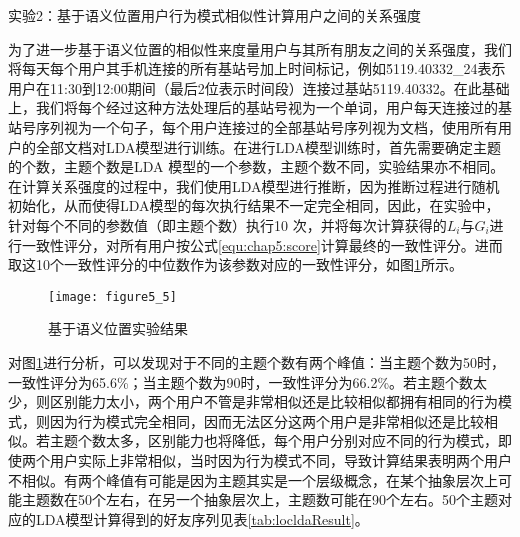 \par 实验2：基于语义位置用户行为模式相似性计算用户之间的关系强度
\par 为了进一步基于语义位置的相似性来度量用户与其所有朋友之间的关系强度，我们将每天每个用户其手机连接的所有基站号加上时间标记，例如\'5119.40332\_24\'表示用户在11:30到12:00期间（最后2位表示时间段）连接过基站5119.40332。在此基础上，我们将每个经过这种方法处理后的基站号视为一个单词，用户每天连接过的基站号序列视为一个句子，每个用户连接过的全部基站号序列视为文档，使用所有用户的全部文档对LDA模型进行训练。在进行LDA模型训练时，首先需要确定主题的个数，主题个数是LDA 模型的一个参数，主题个数不同，实验结果亦不相同。在计算关系强度的过程中，我们使用LDA模型进行推断，因为推断过程进行随机初始化，从而使得LDA模型的每次执行结果不一定完全相同，因此，在实验中，针对每个不同的参数值（即主题个数）执行10 次，并将每次计算获得的$L_{i}$与$G_{i}$进行一致性评分，对所有用户按公式\ref{equ:chap5:score}计算最终的一致性评分。进而取这10个一致性评分的中位数作为该参数对应的一致性评分，如图\ref{fig:5_5}所示。
\begin{figure}[htp]
\centering
\texttt{[image: figure5\_5]}
\caption{基于语义位置实验结果}
\label{fig:5_5}
\end{figure}
\par 对图\ref{fig:5_5}进行分析，可以发现对于不同的主题个数有两个峰值：当主题个数为50时，一致性评分为65.6\%；当主题个数为90时，一致性评分为66.2\%。若主题个数太少，则区别能力太小，两个用户不管是非常相似还是比较相似都拥有相同的行为模式，则因为行为模式完全相同，因而无法区分这两个用户是非常相似还是比较相似。若主题个数太多，区别能力也将降低，每个用户分别对应不同的行为模式，即使两个用户实际上非常相似，当时因为行为模式不同，导致计算结果表明两个用户不相似。有两个峰值有可能是因为主题其实是一个层级概念，在某个抽象层次上可能主题数在50个左右，在另一个抽象层次上，主题数可能在90个左右。50个主题对应的LDA模型计算得到的好友序列见表\ref{tab:locldaResult}。
